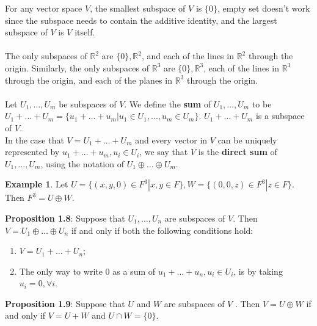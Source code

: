 \documentclass{article}
\theoremstyle{definition}
\newtheorem{ex}{Example}[section]
\begin{document}
For any vector space $V$, the smallest subspace of $V$ is $\{0\}$, empty set doesn't work since the subspace needs to contain the additive identity, and the largest subspace of $V$ is $V$ itself. \\ \\
The only subspaces of ${\mathbb{R}}^2$ are $\{0\}, \mathbb{R}^2$, and each of the lines in $\mathbb{R}^2$ through the origin. Similarly, the only subspaces of ${\mathbb{R}}^3$ are $\{0\}, \mathbb{R}^3$, each of the lines in $\mathbb{R}^3$ through the origin, and each of the planes in $\mathbb{R}^3$ through the origin. \\ \\
Let $U_1, \dots, U_m$ be subspaces of $V$. We define the \textbf{sum} of $U_1, \dots, U_m$ to be $U_1 + \dots + U_m = \{u_1+ \dots + u_m | u_1 \in U_1,...,u_m \in U_m\}$. $U_1 + \dots + U_m$ is a subspace of $V$. \\ In the case that $V = U_1 + \dots + U_m$ and every vector in $V$ can be uniquely represented by $u_1 + \dots + u_m, u_i \in U_i$, we say that $V$ is the \textbf{direct sum} of $U_1, \dots, U_m$, using the notation of $U_1 \oplus \dots \oplus U_m$. 
\begin{ex}
Let $U = \{(x,y,0) \in F^3 |x,y \in F \}, W = \{(0,0,z)\in F^3 |z \in F \}$. Then $F^3 = U \oplus W$.
\end{ex}
\noindent \textbf{Proposition 1.8}: Suppose that $U_1, \dots, U_n$ are subspaces of $V$. Then $V = U_1 \oplus \dots \oplus U_n$ if and only if both the following conditions hold: \begin{enumerate}
    \item $V = U_1 + \dots + U_n$;
    \item The only way to write $0$ as a sum of $u_1 + \dots +u_n, u_i \in U_i$, is by taking $u_i = 0, \forall i$.
\end{enumerate}
\textbf{Proposition 1.9}: Suppose that $U$ and $W$ are subspaces of $V$ . Then $V = U \oplus W$ if and only if $V = U + W$ and $U \cap W = \{0\}$.
\end{document}
